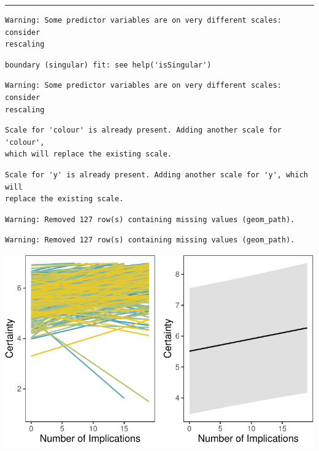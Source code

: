 \documentclass[
  .7em,
  letterpaper,
  DIV=11,
  numbers=noendperiod]{scrartcl}
\begin{document}
\begin{center}\rule{0.5\linewidth}{0.5pt}\end{center}

\begin{verbatim}
Warning: Some predictor variables are on very different scales: consider
rescaling
\end{verbatim}

\begin{verbatim}
boundary (singular) fit: see help('isSingular')
\end{verbatim}

\begin{verbatim}
Warning: Some predictor variables are on very different scales: consider
rescaling
\end{verbatim}

\begin{verbatim}
Scale for 'colour' is already present. Adding another scale for 'colour',
which will replace the existing scale.
\end{verbatim}

\begin{verbatim}
Scale for 'y' is already present. Adding another scale for 'y', which will
replace the existing scale.
\end{verbatim}

\begin{verbatim}
Warning: Removed 127 row(s) containing missing values (geom_path).
\end{verbatim}

\begin{verbatim}
Warning: Removed 127 row(s) containing missing values (geom_path).
\end{verbatim}

\includegraphics{EpMemNet_LabPres_htmldoc_files/figure-pdf/unnamed-chunk-16-1.pdf}
\end{document}
